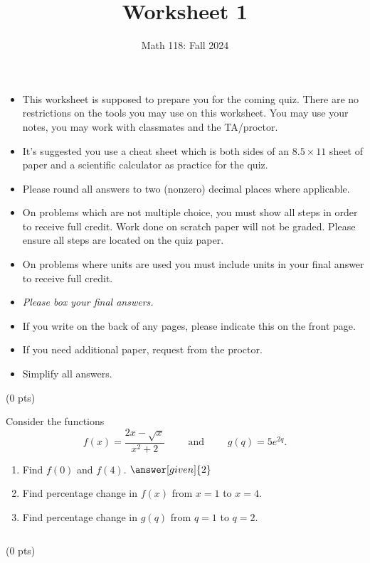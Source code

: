 \documentclass{ximera}
\title{Worksheet 1}
\author{Math 118: Fall 2024}
\begin{document}
\normalsize

\begin{itemize}
    \item This worksheet is supposed to prepare you for the coming quiz. There are no restrictions on the tools you may use on this worksheet. You may use your notes, you may work with classmates and the TA/proctor. 
    \item It's suggested you use a cheat sheet which is both sides of an $8.5\times 11$ sheet of paper and a scientific calculator as practice for the quiz.
    \item Please round all answers to two (nonzero) decimal places where applicable.
    \item On problems which are not multiple choice, you must show all steps in order to receive full credit. Work done on scratch paper will not be graded. Please ensure all steps are located on the quiz paper. 
    \item On problems where units are used you must include units in your final answer to receive full credit.
    \item {\it Please box your final answers.}
    \item If you write on the back of any pages, please indicate this on the front page.
    \item If you need additional paper, request from the proctor.
    \item Simplify all answers.
\end{itemize}


 (0 pts)

Consider the functions $$f(x)=\frac{2x-\sqrt{x}}{x^2+2}\qquad\text{ and }\qquad g(q)=5e^{2q}.$$

     \begin{enumerate}[label=(\alph*)]
        \item Find $f(0)$ and $f(4)$. $\answer[given]{2}$ \vspace{5cm}
        \item Find percentage change in $f(x)$ from $x=1$ to $x=4$. \vspace{5cm}
        \item Find percentage change in $g(q)$ from $q=1$ to $q=2$. 
    \end{enumerate}
    


\newpage $\,$
\newpage


 (0 pts)
\end{document}
